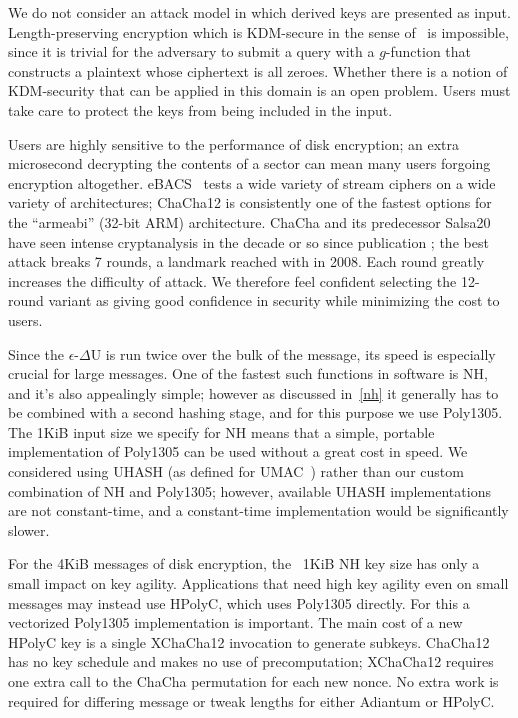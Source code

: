 \documentclass[eprint.tex]{subfiles}
\begin{document}
We do not consider an attack model in which derived keys are presented as input.
Length-preserving encryption
which is KDM-secure in the sense of~\cite{kdm} is impossible, since it is trivial for the
adversary to submit a query with a $g$-function
that constructs a plaintext whose ciphertext is all zeroes.
Whether there is a notion of KDM-security that can be
applied in this domain is an open problem. Users must take care to protect the keys from being
included in the input.

Users are highly sensitive to the performance of disk encryption; an
extra microsecond decrypting the contents of a sector can mean many users
forgoing encryption altogether.
eBACS~\cite{supercop} tests a wide variety of stream ciphers on a wide variety
of architectures; ChaCha12 is consistently one of the
fastest options for the ``armeabi'' (32-bit ARM) architecture.
ChaCha and its predecessor Salsa20
have seen intense cryptanalysis in the decade or so since publication
\cite{tdcs20,nonrandomsalsa,tsunoo,latindance,ishiguro2011,ishiguro2012,zhenqing2012,
maitra2015,chachamaitra,choudhuri2016,dey2017,Choudhuri_Maitra_2017,chacha2018};
the best attack breaks 7 rounds, a landmark reached with \cite{latindance} in 2008.
Each round greatly increases the difficulty of attack.
We therefore feel confident selecting the 12-round variant as giving
good confidence in security while minimizing the cost to users.

Since the $\epsilon$-$\Delta$U is run twice over the bulk of the message, its speed is especially
crucial for large messages. One of the fastest such functions in software is NH, and
it's also appealingly simple; however as discussed in~\autoref{nh} it generally has to be
combined with a second hashing stage, and for this purpose we use Poly1305. The 1KiB input size
we specify for NH means that a simple, portable implementation of Poly1305 can be used without a great
cost in speed.  We considered using UHASH (as defined for UMAC~\cite{rfc4418}) rather than our
custom combination of NH and Poly1305; however, available UHASH implementations
are not constant-time, and a constant-time implementation would be significantly
slower.

For the 4KiB messages of disk encryption,
the ~1KiB NH key size has only a small impact on key agility. Applications
that need high key agility even on small messages may instead use HPolyC, which
uses Poly1305 directly. For this a vectorized Poly1305 implementation is important.  The main
cost of a new HPolyC key is a single XChaCha12 invocation to generate subkeys.
ChaCha12 has no key schedule
and makes no use of precomputation; XChaCha12
requires one extra call to the ChaCha permutation for each new nonce.
No extra work is required for differing message or tweak lengths for either Adiantum
or HPolyC.
\end{document}
